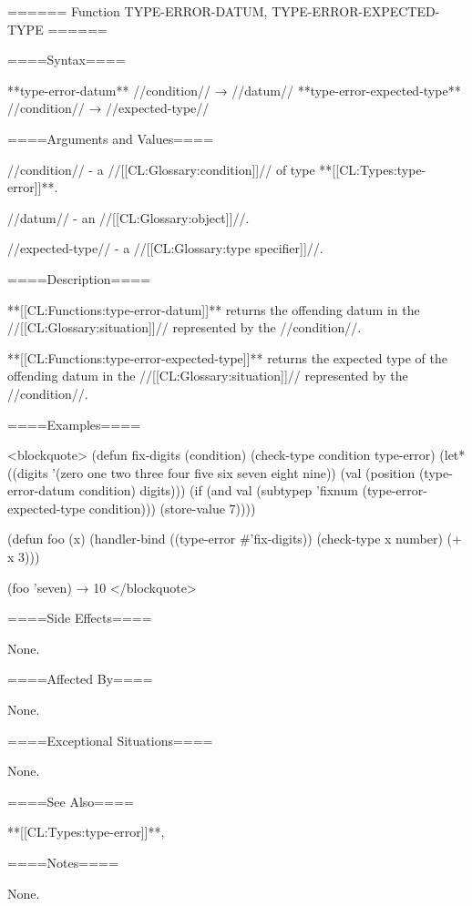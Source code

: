 ====== Function TYPE-ERROR-DATUM, TYPE-ERROR-EXPECTED-TYPE ======

====Syntax====

**type-error-datum** //condition// → //datum// **type-error-expected-type** //condition// → //expected-type//

====Arguments and Values====

//condition// - a //[[CL:Glossary:condition]]// of type **[[CL:Types:type-error]]**.

//datum// - an //[[CL:Glossary:object]]//.

//expected-type// - a //[[CL:Glossary:type specifier]]//.

====Description====

**[[CL:Functions:type-error-datum]]** returns the offending datum in the //[[CL:Glossary:situation]]// represented by the //condition//.

**[[CL:Functions:type-error-expected-type]]** returns the expected type of the offending datum in the //[[CL:Glossary:situation]]// represented by the //condition//.

====Examples====

<blockquote> (defun fix-digits (condition) (check-type condition type-error) (let* ((digits '(zero one two three four five six seven eight nine)) (val (position (type-error-datum condition) digits))) (if (and val (subtypep 'fixnum (type-error-expected-type condition))) (store-value 7))))

(defun foo (x) (handler-bind ((type-error #'fix-digits)) (check-type x number) (+ x 3)))

(foo 'seven) → 10 </blockquote>

====Side Effects====

None.

====Affected By====

None.

====Exceptional Situations====

None.

====See Also====

**[[CL:Types:type-error]]**,{\secref\Conditions}

====Notes====

None.

